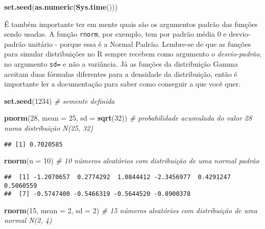 \documentclass[
]{article}
\newenvironment{Shaded}{\begin{snugshade}}{\end{snugshade}}
\newcommand{\CommentTok}[1]{\textcolor[rgb]{0.56,0.35,0.01}{\textit{#1}}}
\newcommand{\DataTypeTok}[1]{\textcolor[rgb]{0.13,0.29,0.53}{#1}}
\newcommand{\DecValTok}[1]{\textcolor[rgb]{0.00,0.00,0.81}{#1}}
\newcommand{\KeywordTok}[1]{\textcolor[rgb]{0.13,0.29,0.53}{\textbf{#1}}}
\newcommand{\NormalTok}[1]{#1}
\begin{document}
\begin{Shaded}
\begin{Highlighting}[]
\KeywordTok{set.seed}\NormalTok{(}\KeywordTok{as.numeric}\NormalTok{(}\KeywordTok{Sys.time}\NormalTok{()))}
\end{Highlighting}
\end{Shaded}

É também importante ter em mente quais são os argumentos padrão das
funções sendo usadas. A função \texttt{rnorm}, por exemplo, tem por
padrão média 0 e desvio-padrão unitário - porque essa é a Normal Padrão.
Lembre-se de que as funções para simular distribuições no R sempre
recebem como argumento o \emph{desvio-padrão}, no argumento \texttt{sd=}
e não a variância. Já as funções da distribuição Gamma aceitam duas
fórmulas diferentes para a densidade da distribuição, então é importante
ler a documentação para saber como conseguir a que você quer.

\begin{Shaded}
\begin{Highlighting}[]
\KeywordTok{set.seed}\NormalTok{(}\DecValTok{1234}\NormalTok{) }\CommentTok{# semente definida}

\KeywordTok{pnorm}\NormalTok{(}\DecValTok{28}\NormalTok{, }\DataTypeTok{mean =} \DecValTok{25}\NormalTok{, }\DataTypeTok{sd =} \KeywordTok{sqrt}\NormalTok{(}\DecValTok{32}\NormalTok{)) }\CommentTok{# probabilidade acumulada do valor 28 numa distribuição N(25, 32)}
\end{Highlighting}
\end{Shaded}

\begin{verbatim}
## [1] 0.7020585
\end{verbatim}

\begin{Shaded}
\begin{Highlighting}[]
\KeywordTok{rnorm}\NormalTok{(}\DataTypeTok{n =} \DecValTok{10}\NormalTok{) }\CommentTok{# 10 números aleatórios com distribuição de uma normal padrão}
\end{Highlighting}
\end{Shaded}

\begin{verbatim}
##  [1] -1.2070657  0.2774292  1.0844412 -2.3456977  0.4291247  0.5060559
##  [7] -0.5747400 -0.5466319 -0.5644520 -0.8900378
\end{verbatim}

\begin{Shaded}
\begin{Highlighting}[]
\KeywordTok{rnorm}\NormalTok{(}\DecValTok{15}\NormalTok{, }\DataTypeTok{mean =} \DecValTok{2}\NormalTok{, }\DataTypeTok{sd =} \DecValTok{2}\NormalTok{) }\CommentTok{# 15 números aleatórios com distribuição de uma normal N(2, 4)}
\end{Highlighting}
\end{Shaded}
\end{document}
